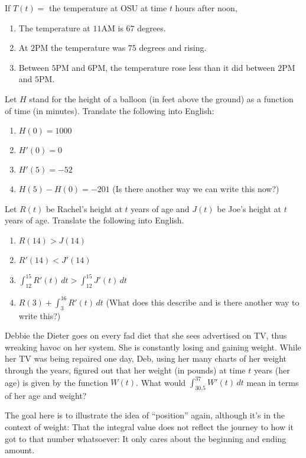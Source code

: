 \documentclass{ximera}
\begin{document}
\begin{question} 
If $T(t) =$ the temperature at OSU at time $t$ hours after noon, 
\begin{enumerate} 
\item 	The temperature at $11$AM is $67$ degrees.
\item 	At $2$PM the temperature was $75$ degrees and rising.
\item 	Between $5$PM and $6$PM, the temperature rose less than it did between $2$PM and $5$PM.
\end{enumerate}
\end{question} 



\begin{question} 
Let $H$ stand for the height of a balloon (in feet above the ground) as a function of time (in minutes). Translate the following into English: 
\begin{enumerate} 
\item $H(0) = 1000$
\item $H'(0) = 0$
\item $H'(5) = -52$
\item $H(5) - H(0) = -201$ (Is there another way we can write this now?)
\end{enumerate}                  
\end{question} 

\begin{question} 
Let $R(t)$ be Rachel's height at $t$ years of age and $J(t)$ be Joe's height at $t$ years of age.  Translate the following into English.
\begin{enumerate}
    \item $R(14) > J(14)$
    \item $R'(14) < J'(14)$
    \item $\int_{12}^{15} R'(t) \, dt > \int_{12}^{15} J'(t) \, dt$
    \item $R(3) + \int_3^{16} R'(t)\, dt$ (What does this describe and is there another way to write this?)
\end{enumerate}
\end{question}

\begin{question} 
Debbie the Dieter goes on every fad diet that she sees advertised on TV, thus wreaking havoc on her system.  She is constantly losing and gaining weight.  While her TV was being repaired one day, Deb, using her many charts of her weight through the years, figured out that her weight (in pounds) at time $t$ years (her age) is given by the function  $W(t)$.  What would $\int_{30.5}^{37} W'(t)\, dt$ mean in terms of her age and weight?

\begin{instructorNotes}
The goal here is to illustrate the idea of ``position'' again, although it's in the context of weight:  That the integral value does not reflect the journey to how it got to that number whatsoever:  It only cares about the beginning and ending amount.  
\end{instructorNotes}


\end{question}
\end{document}
